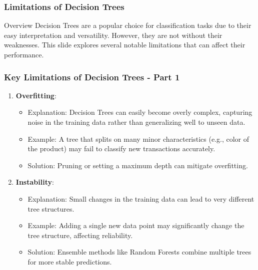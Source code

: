 \documentclass[aspectratio=169]{beamer}
\begin{document}
\begin{frame}[fragile]
    \frametitle{Limitations of Decision Trees}
    \begin{block}{Overview}
        Decision Trees are a popular choice for classification tasks due to their easy interpretation and versatility. However, they are not without their weaknesses. This slide explores several notable limitations that can affect their performance.
    \end{block}
\end{frame}

\begin{frame}[fragile]
    \frametitle{Key Limitations of Decision Trees - Part 1}
    \begin{enumerate}
        \item \textbf{Overfitting}:
            \begin{itemize}
                \item Explanation: Decision Trees can easily become overly complex, capturing noise in the training data rather than generalizing well to unseen data.
                \item Example: A tree that splits on many minor characteristics (e.g., color of the product) may fail to classify new transactions accurately.
                \item Solution: Pruning or setting a maximum depth can mitigate overfitting.
            \end{itemize}
        
        \item \textbf{Instability}:
            \begin{itemize}
                \item Explanation: Small changes in the training data can lead to very different tree structures.
                \item Example: Adding a single new data point may significantly change the tree structure, affecting reliability.
                \item Solution: Ensemble methods like Random Forests combine multiple trees for more stable predictions.
            \end{itemize}
    \end{enumerate}
\end{frame}
\end{document}
